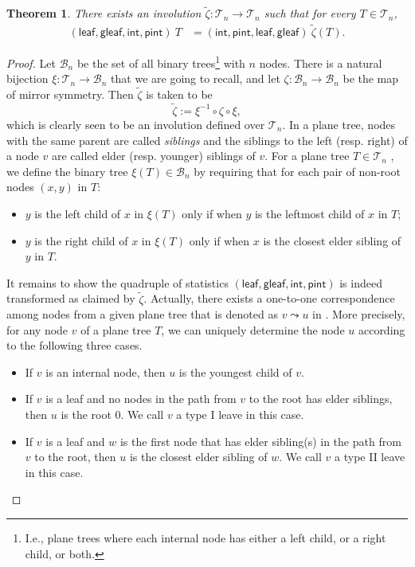 \documentclass[reqno]{amsart}
\numberwithin{equation}{section}
\newtheorem{theorem}{Theorem}[section]
\theoremstyle{definition}
\theoremstyle{named}
\newcommand{\cT}{\mathcal{T}}
\newcommand{\cB}{\mathcal{B}}
\newcommand{\curly}{\mathrel{\leadsto}}
\def\leaf{\mathsf{leaf}}
\def\gleaf{\mathsf{gleaf}}
\def\int{\mathsf{int}}
\def\pint{\mathsf{pint}}
\begin{document}
\begin{theorem}\label{thm:quadruple}
There exists an involution $\widetilde{\zeta}: \cT_n\to\cT_n$ such that for every $T\in\cT_n$,
\begin{align*}
(\leaf,\gleaf,\int,\pint)\:T &= (\int,\pint,\leaf,\gleaf)\:\widetilde{\zeta}(T).
\end{align*} 
\end{theorem}
\begin{proof}
Let $\cB_n$ be the set of all binary trees\footnote{I.e., plane trees where each internal node has either a left child, or a right child, or both.} with $n$ nodes. There is a natural bijection $\xi:\cT_n\to\cB_n$ that we are going to recall, and let $\zeta:\cB_n\to\cB_n$ be the map of mirror symmetry. Then $\widetilde{\zeta}$ is taken to be
$$\widetilde{\zeta}:=\xi^{-1}\circ \zeta \circ \xi,$$
which is clearly seen to be an involution defined over $\cT_n$. In a plane tree, nodes with the same parent are called {\it siblings} and the siblings to the left
(resp. right) of a node $v$ are called elder (resp. younger) siblings of $v$. For a plane tree $T\in \mathcal{T}_n$ , we define the binary tree $\xi(T)\in \mathcal{B}_n$  by requiring that for each pair of non-root nodes $(x,y)$ in $T$:
\begin{itemize}
\item [(a)]$y$ is the left child of $x$ in $\xi(T)$ only if when $y$ is the leftmost child of $x$ in $T$;
\item [(b)]$y$ is the right child of $x$ in $\xi(T)$ only if when $x$ is the closest elder sibling of $y$ in $T$.
\end{itemize}
It remains to show the quadruple of statistics $(\leaf,\gleaf,\int,\pint)$ is indeed transformed as claimed by $\widetilde{\zeta}$. Actually, there exists a one-to-one correspondence among nodes from a given plane tree that is denoted as $v\curly u$ in \cite{LLZ2024}. More precisely, for any node $v$ of a plane tree $T$, we can uniquely determine the node $u$ according to the following three cases.
\begin{itemize}
	\item If $v$ is an internal node, then $u$ is the youngest child of $v$.
	\item If $v$ is a leaf and no nodes in the path from $v$ to the root has elder siblings, then $u$ is the root $0$. We call $v$ a type I leave in this case.
	\item If $v$ is a leaf and $w$ is the first node that has elder sibling(s) in the path from $v$ to the root, then $u$ is the closest elder sibling of $w$. We call $v$ a type II leave in this case.
\end{itemize} 


\end{proof}
\end{document}
